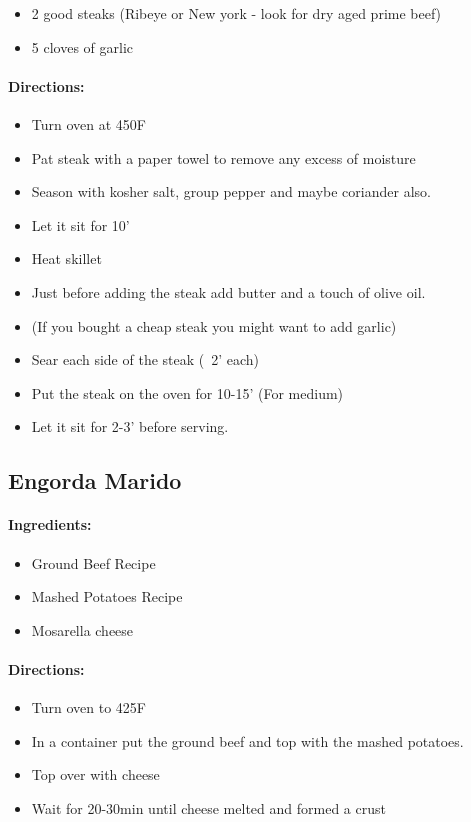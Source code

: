 \documentclass{article}
\begin{document}
\begin{itemize}
	\item 2 good steaks (Ribeye or New york - look for dry aged prime beef)
	\item 5 cloves of garlic
\end{itemize}

\paragraph{Directions:}
\begin{itemize}
	\item Turn oven at 450F
	\item Pat steak with a paper towel to remove any excess of moisture
	\item Season with kosher salt, group pepper and maybe coriander also.
	\item Let it sit for 10'
	\item Heat skillet
	\item Just before adding the steak add butter and a touch of olive oil.
	\item (If you bought a cheap steak you might want to add garlic)
	\item Sear each side of the steak (~2' each)
	\item Put the steak on the oven for 10-15' (For medium)
	\item Let it sit for 2-3' before serving.
\end{itemize}

\subsection{Engorda Marido}

\paragraph{Ingredients:}

\begin{itemize}
	\item Ground Beef Recipe
	\item Mashed Potatoes Recipe
	\item Mosarella cheese
\end{itemize}

\paragraph{Directions:}
\begin{itemize}
	\item Turn oven to 425F
	\item In a container put the ground beef and top with the mashed potatoes.
	\item Top over with cheese
	\item Wait for 20-30min until cheese melted and formed a crust
\end{itemize}
\end{document}

